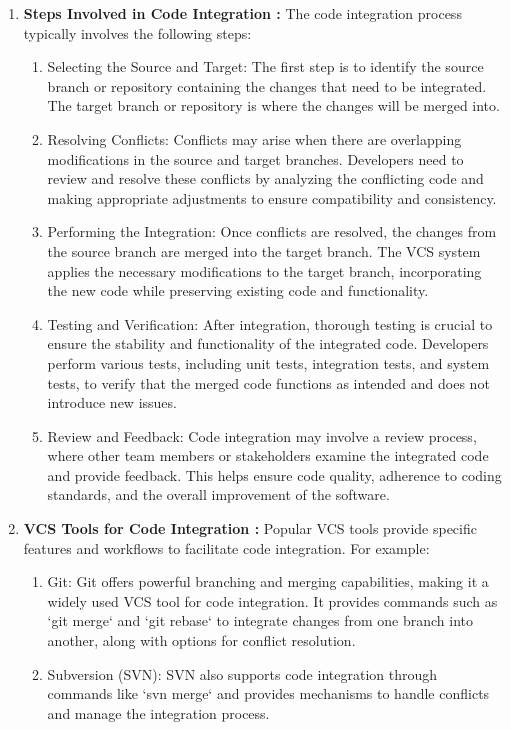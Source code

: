 \begin{enumerate}
\begin{enumerate}
    \end{enumerate}
    \item \textbf{Steps Involved in Code Integration : }The code integration process typically involves the following steps:
    \begin{enumerate}
        \item Selecting the Source and Target: The first step is to identify the source branch or repository containing the changes that need to be integrated. The target branch or repository is where the changes will be merged into.
        \item Resolving Conflicts: Conflicts may arise when there are overlapping modifications in the source and target branches. Developers need to review and resolve these conflicts by analyzing the conflicting code and making appropriate adjustments to ensure compatibility and consistency.
        \item Performing the Integration: Once conflicts are resolved, the changes from the source branch are merged into the target branch. The VCS system applies the necessary modifications to the target branch, incorporating the new code while preserving existing code and functionality.
        \item Testing and Verification: After integration, thorough testing is crucial to ensure the stability and functionality of the integrated code. Developers perform various tests, including unit tests, integration tests, and system tests, to verify that the merged code functions as intended and does not introduce new issues.
        \item Review and Feedback: Code integration may involve a review process, where other team members or stakeholders examine the integrated code and provide feedback. This helps ensure code quality, adherence to coding standards, and the overall improvement of the software.
    \end{enumerate}
    \item \textbf{VCS Tools for Code Integration : }Popular VCS tools provide specific features and workflows to facilitate code integration. For example:
    \begin{enumerate}
        \item Git: Git offers powerful branching and merging capabilities, making it a widely used VCS tool for code integration. It provides commands such as `git merge` and `git rebase` to integrate changes from one branch into another, along with options for conflict resolution.
        \item Subversion (SVN): SVN also supports code integration through commands like `svn merge` and provides mechanisms to handle conflicts and manage the integration process.


\end{enumerate}
\end{enumerate}
